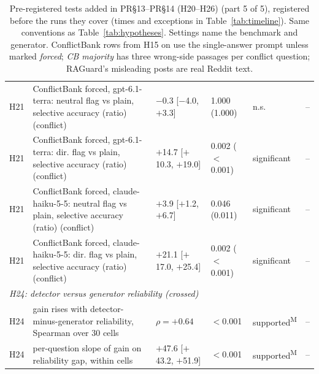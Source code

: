 \begin{table}[p]
{\begin{tabular}{lp{6.6cm}llll}
H21 & ConflictBank forced, gpt-6.1-terra: neutral flag vs plain, selective accuracy (ratio) (conflict) & $-$0.3 [$-$4.0, $+$3.3] & 1.000 (1.000) & n.s. & -- \\
H21 & ConflictBank forced, gpt-6.1-terra: dir. flag vs plain, selective accuracy (ratio) (conflict) & $+$14.7 [$+$10.3, $+$19.0] & 0.002 ($<$0.001) & significant & -- \\
H21 & ConflictBank forced, claude-haiku-5-5: neutral flag vs plain, selective accuracy (ratio) (conflict) & $+$3.9 [$+$1.2, $+$6.7] & 0.046 (0.011) & significant & -- \\
H21 & ConflictBank forced, claude-haiku-5-5: dir. flag vs plain, selective accuracy (ratio) (conflict) & $+$21.1 [$+$17.0, $+$25.4] & 0.002 ($<$0.001) & significant & -- \\
\multicolumn{6}{l}{\emph{H24: detector versus generator reliability (crossed)}} \\
H24 & gain rises with detector-minus-generator reliability, Spearman over 30 cells & $\rho=+0.64$ & $<$0.001 & supported\textsuperscript{M} & -- \\
H24 & per-question slope of gain on reliability gap, within cells & $+$47.6 [$+$43.2, $+$51.9] & $<$0.001 & supported\textsuperscript{M} & -- \\
\bottomrule
\end{tabular}}
\caption{Pre-registered tests added in PR\S13--PR\S14 (H20--H26) (part 5 of 5), registered before the runs they cover (times and exceptions in
Table~\ref{tab:timeline}). Same conventions as
Table~\ref{tab:hypotheses}. Settings name the benchmark and generator. ConflictBank rows from H15 on use the
single-answer prompt unless marked \emph{forced}; \emph{CB majority} has three wrong-side passages per conflict
question; RAGuard's misleading posts are real Reddit text.}
\label{tab:hypotheses10}
\end{table}

